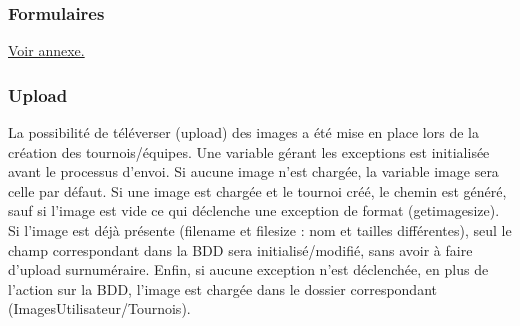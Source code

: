 \documentclass[12pt]{report}
\begin{document}
        \subsubsection{Formulaires}
\par
\hypertarget{retour-formulaires}{}
\hyperlink{annexe-formulaires}{Voir annexe.} 
        \subsubsection{Upload}
\par                
La possibilité de téléverser (upload) des images a été mise en place lors de la création des tournois/équipes. Une variable gérant les exceptions est initialisée avant le processus d’envoi. Si aucune image n’est chargée, la variable image sera celle par défaut. Si une image est chargée et le tournoi créé, le chemin est généré, sauf si l’image est vide ce qui déclenche une exception de format (getimagesize). Si l’image est déjà présente (filename et filesize : nom et tailles différentes), seul le champ correspondant dans la BDD sera initialisé/modifié, sans avoir à faire d’upload surnuméraire. Enfin, si aucune exception n’est déclenchée, en plus de l’action sur la BDD, l’image est chargée dans le dossier correspondant (ImagesUtilisateur/Tournois).
\end{document}
